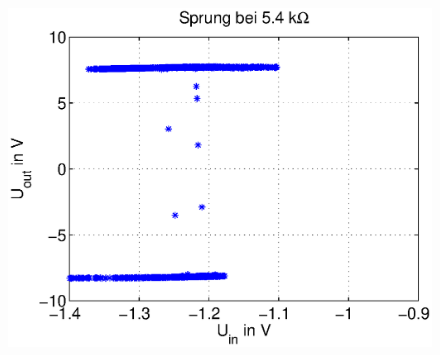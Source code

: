 \begin{frame}
\begin{columns}[c]
            \begin{figure}[H]
            \begin{center}
                    \includegraphics[scale=0.3]{./img/plots/Auf_1_5_4_Sprung.eps}
            \end{center}
            \end{figure}
            
    \end{columns}
\end{frame}

